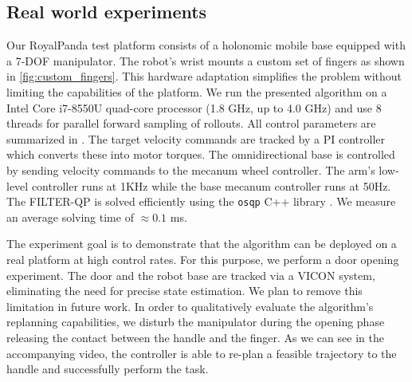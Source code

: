\subsection{Real world experiments}
Our RoyalPanda test platform consists of a holonomic mobile base equipped with a 7-DOF manipulator. The robot's wrist mounts a custom set of fingers as shown in \fig\ref{fig:custom_fingers}. This hardware adaptation simplifies the problem without limiting the capabilities of the platform. We run the presented algorithm on a Intel Core i7-8550U quad-core processor (1.8 GHz, up to 4.0 GHz) and use 8 threads for parallel forward sampling of rollouts. All control parameters are summarized in \tab {}. The target velocity commands are tracked by a PI controller which converts these into motor torques. The omnidirectional base is controlled by sending velocity commands to the mecanum wheel controller. The arm's low-level controller runs at 1KHz while the base mecanum controller runs at 50Hz. The FILTER-QP is solved efficiently using the \texttt{osqp} C++ library \cite{osqp}. We measure an average solving time of $\approx 0.1$ ms.  


The experiment goal is to demonstrate that the algorithm can be deployed on a real platform at high control rates. For this purpose, we perform a door opening experiment. The door and the robot base are tracked via a VICON system, eliminating the need for precise state estimation. We plan to remove this limitation in future work. In order to qualitatively evaluate the algorithm's replanning capabilities, we disturb the manipulator during the opening phase releasing the contact between the handle and the finger. As we can see in the accompanying video, the controller is able to re-plan a feasible trajectory to the handle and successfully perform the task.